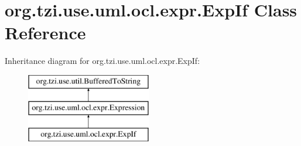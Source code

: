 \hypertarget{classorg_1_1tzi_1_1use_1_1uml_1_1ocl_1_1expr_1_1_exp_if}{\section{org.\-tzi.\-use.\-uml.\-ocl.\-expr.\-Exp\-If Class Reference}
\label{classorg_1_1tzi_1_1use_1_1uml_1_1ocl_1_1expr_1_1_exp_if}
}
Inheritance diagram for org.\-tzi.\-use.\-uml.\-ocl.\-expr.\-Exp\-If\-:\begin{figure}[H]
\begin{center}
\leavevmode
\includegraphics[height=3.000000cm]{classorg_1_1tzi_1_1use_1_1uml_1_1ocl_1_1expr_1_1_exp_if}
\end{center}
\end{figure}
